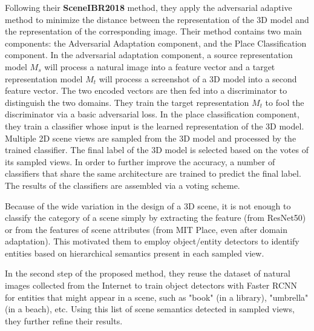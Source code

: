 \documentclass[../main.tex]{subfiles}
\begin{document}
	
	Following their \textbf{SceneIBR2018} method, they apply the adversarial 
	adaptive method to minimize the distance between the representation of the 
	3D model and the representation of the corresponding image. Their method 
	contains two main components: the Adversarial Adaptation component, and the 
	Place Classification component. In the adversarial adaptation component, a 
	source representation model $M_s$ will process a natural image into a 
	feature vector and a target representation model $M_t$ will process a 
	screenshot of a 3D model into a second feature vector. The two encoded 
	vectors are then fed into a discriminator to distinguish the two domains. 
	They train the target representation $M_t$ to fool the discriminator via a 
	basic adversarial loss. In the place classification component, they train a 
	classifier whose input is the learned representation of the 3D model. 
	Multiple 2D scene views are sampled from the 3D model and processed by the 
	trained classifier. The final label of the 3D model is selected based on the 
	votes of its sampled views. In order to further improve the accuracy, a 
	number of classifiers that share the same architecture are trained to 
	predict the final label. The results of the classifiers are assembled via a 
	voting scheme.
	
	Because of the wide variation in the design of a 3D scene, it is not enough 
	to classify the category of a scene simply by extracting the feature (from 
	ResNet50) or from the features of scene attributes (from MIT Place, even 
	after domain adaptation). This motivated them to employ object/entity 
	detectors to identify entities based on hierarchical semantics present in 
	each sampled view.
	
	In the second step of the proposed method, they reuse the dataset of natural images collected from the Internet to train object detectors with Faster RCNN \cite{DBLP:journals/corr/RenHG015} for entities that might appear in a scene, such as "book" (in a library), "umbrella" (in a beach), etc. Using this  list of scene semantics detected in sampled views, they further refine their results.
\end{document}
